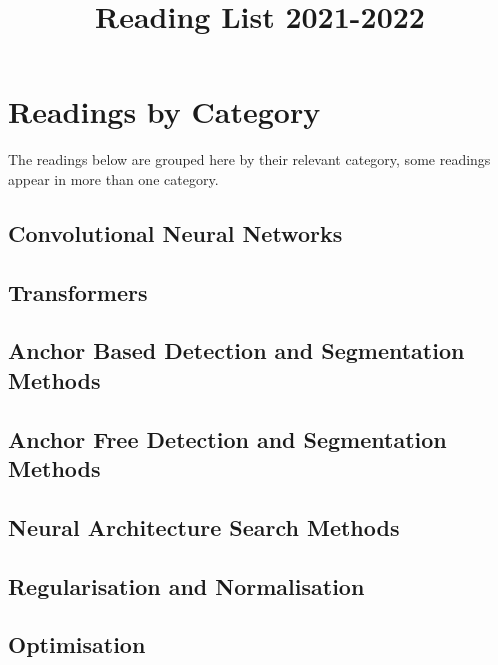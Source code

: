 \documentclass[7p]{article}
\title{Reading List 2021-2022}
\begin{document}
\maketitle
\section*{Readings by Category}
The readings below are grouped here by their relevant category, some readings appear in more than one category.
\subsection*{Convolutional Neural Networks}
\citet{lecun1998gradient, krizhevsky2012imagenet, simonyan2014very, szegedy2015going, he2016deep, zerhouni2017wide, xie2017aggregated, hu2018squeeze, sandler2018mobilenetv2,  tan2019efficientnet, tan2021efficientnetv2}

\subsection*{Transformers}
\citet{vaswani2017attention, cordonnier2019relationship, dosovitskiy2020image, liu2021swin}

\subsection*{Anchor Based Detection and Segmentation Methods}
\citet{girshick2014rich, girshick2015fast, ren2015faster, He2017, tan2020efficientdet, cai2019cascade, chen2019hybrid}

\subsection*{Anchor Free Detection and Segmentation Methods}
\citet{redmon2016you, redmon2018yolov3}

\subsection*{Neural Architecture Search Methods}
\citet{tan2019efficientnet, tan2021efficientnetv2, tan2020efficientdet}

\subsection*{Regularisation and Normalisation}
\citet{srivastava2014dropout, ioffe2015batch, salimans2016weight, wu2018group}

\subsection*{Optimisation}
\citet{kingma2014adam}
\end{document}
